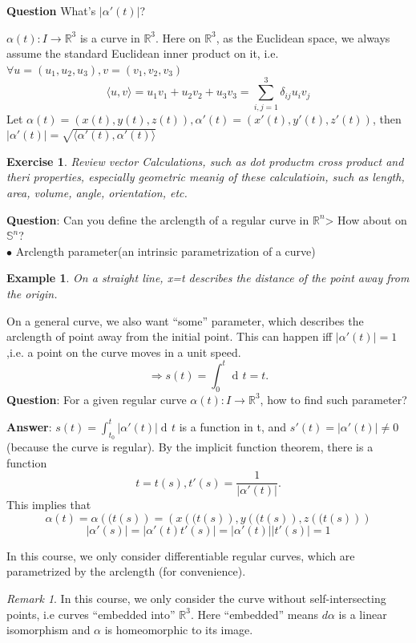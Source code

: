 \documentclass[UTF8,oneside,11pt]{book}
\DeclareMathOperator{\dd}{d\!}
\theoremstyle{plain}\newtheorem{thm}{Theorem}
\theoremstyle{definition}\newtheorem{defn}[thm]{Definition}
\theoremstyle{plain}\newtheorem{axiom}[thm]{Axiom}
\theoremstyle{plain}\newtheorem{coro}[thm]{Corollary}
\theoremstyle{plain}\newtheorem{lemma}[thm]{Lemma}
\theoremstyle{plain}\newtheorem{prop}[thm]{Proposition}
\theoremstyle{plain}\newtheorem{conj}[thm]{Conjecture}
\theoremstyle{plain}\newtheorem{ques}[thm]{Problem}
\theoremstyle{plain}\newtheorem{const}[thm]{Construction}
\theoremstyle{remark}\newtheorem{notation}[thm]{Notation}
\theoremstyle{plain}\newtheorem*{app}{Application}
\theoremstyle{plain}\newtheorem*{exam}{Example}
\theoremstyle{plain}\newtheorem*{exer}{Exercise}
\theoremstyle{remark}\newtheorem*{remark}{Remark}
\theoremstyle{remark}\newtheorem*{note}{\small{Note}}
\numberwithin{equation}{section}
\numberwithin{thm}{section}
\begin{document}
\textbf{Question} What's $\left|\alpha'(t)\right|$?
\par 
$\alpha(t)\colon I\to \mathbb{R}^3$ is a curve in $\mathbb{R}^3$. Here on $\mathbb{R}^3$, as the Euclidean space, we always assume the standard Euclidean inner product on it, i.e. $\forall u=(u_1,u_2,u_3),v=(v_1,v_2,v_3)$
\[\langle u,v\rangle=u_1 v_1+u_2 v_2+ u_3 v_3=\sum_{i,j=1}^3\delta_{ij}u_i v_j\]
Let $\alpha(t)=\left(x\left(t\right),y\left(t\right),z\left(t\right)\right),\alpha'\left(t\right)=\left(x'\left(t\right),y'\left(t\right),z'\left(t\right)\right)$, then $\left|\alpha'(t)\right|=\sqrt{\langle\alpha'\left(t\right),\alpha'\left(t\right)\rangle}$
\begin{exer}
    Review vector Calculations, such as dot productm cross product and theri properties, especially geometric meanig of these calculatioin, such as length, area, volume, angle, orientation, etc.
\end{exer}
\textbf{Question}: Can you define the arclength of a regular curve in $\mathbb{R}^n$> How about on $\mathbb{S}^n$?
\\
$\bullet$ Arclength parameter(an intrinsic parametrization of a curve)
\begin{exam}
    On a straight line, x=t describes the distance of the point away from the origin.
    \begin{figure}[H]\centering
    \end{figure}
\end{exam}
On a general curve, we also want ``some'' parameter, which describes the arclength of point away from the initial point. This can happen iff $|\alpha'(t)|=1$,i.e. a point on the curve moves in a unit speed.
\[\Rightarrow s(t)=\int_0^t \dd t=t.\]
\textbf{Question}: For a given regular curve $\alpha(t)\colon I\to \mathbb{R}^3$, how to find such parameter?
\par 
\textbf{Answer}: $s(t)=\int_{t_0}^t \left|\alpha'(t)\right|\dd t$ is a function in t, and $s'(t)=\left|\alpha'(t)\right|\neq 0$(because the curve is regular). By the implicit function theorem, there is a function 
\[t=t(s),t'(s)=\frac{1}{\left|\alpha'(t)\right|}.\]
This implies that 
\[\alpha(t)=\alpha\left((t(s)\right)=\left(x\left((t(s)\right),y\left((t(s)\right),z\left((t(s)\right)\right)\]
\[\left|\alpha'(s)\right|=\left|\alpha'(t)t'(s)\right|=\left|\alpha'(t)\right|\left|t'(s)\right|=1\]
\par 
{} In this course, we only consider differentiable regular curves, which are parametrized by the arclength (for convenience).
\begin{remark}
    In this course, we only consider the curve without self-intersecting points, i.e curves ``embedded into'' $\mathbb{R}^3$. Here ``embedded'' means $d\alpha$ is a linear isomorphism and $\alpha$ is homeomorphic to its image.
\end{remark}

\printbibliography{} %
\end{document}
